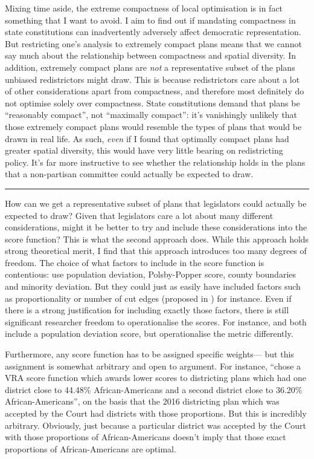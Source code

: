 \documentclass[]{article}
\begin{document}
Mixing time aside, the extreme compactness of local optimisation is in
fact something that I want to avoid. I aim to find out if mandating
compactness in state constitutions can inadvertently adversely affect
democratic representation. But restricting one's analysis to extremely
compact plans means that we cannot say much about the relationship
between compactness and spatial diversity. In addition, extremely
compact plans are \emph{not} a representative subset of the plans
unbiased redistrictors might draw. This is because redistrictors care
about a lot of other considerations apart from compactness, and
therefore most definitely do not optimise solely over compactness. State
constitutions demand that plans be ``reasonably compact'', not
``maximally compact'': it's vanishingly unlikely that those extremely
compact plans would resemble the types of plans that would be drawn in
real life. As such, \emph{even} if I found that optimally compact plans
had greater spatial diversity, this would have very little bearing on
redistricting policy. It's far more instructive to see whether the
relationship holds in the plans that a non-partisan committee could
actually be expected to draw.

\begin{center}\rule{0.5\linewidth}{\linethickness}\end{center}

How can we get a representative subset of plans that legislators could
actually be expected to draw? Given that legislators care a lot about
many different considerations, might it be better to try and include
these considerations into the score function? This is what the second
approach does. While this approach holds strong theoretical merit, I
find that this approach introduces too many degrees of freedom. The
choice of what factors to include in the score function is contentious:
\citeauthor{h2018} use population deviation, Polsby-Popper score, county
boundaries and minority deviation. But they could just as easily have
included factors such as proportionality or number of cut edges
(proposed in \cite{dc2016}) for instance. Even if there is a strong
justification for including exactly those factors, there is still
significant researcher freedom to operationalise the scores. For
instance, \citeauthor{h2018} and \citeauthor{dd2019va} both include a
population deviation score, but operationalise the metric differently.

Furthermore, any score function has to be assigned specific weights---
but this assignment is somewhat arbitrary and open to argument. For
instance, \citeauthor{h2018} ``chose a VRA score function which awards
lower scores to districting plans which had one district close to
44.48\% African-Americans and a second district close to 36.20\%
African-Americans'', on the basis that the 2016 districting plan which
was accepted by the Court had districts with those proportions. But this
is incredibly arbitrary. Obviously, just because a particular district
was accepted by the Court with those proportions of African-Americans
doesn't imply that those exact proportions of African-Americans are
optimal.
\end{document}

